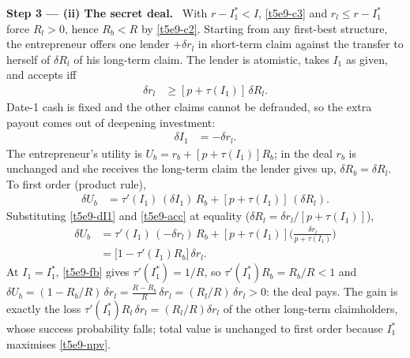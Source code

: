 \documentclass[11pt,a4paper]{article}
\newcommand{\step}[2]{\par\medskip\noindent\textbf{Step #1 --- #2.}~}
\begin{document}
\step{3}{(ii) The secret deal} With $r-I_1^*<I$, \eqref{t5e9-c3} and $r_l\le r-I_1^*$ force $R_l>0$, hence $R_b<R$
by \eqref{t5e9-c2}. Starting from any first-best structure, the entrepreneur offers one lender $+\delta r_l$ in short-term
claim against the transfer to herself of $\delta R_l$ of his long-term claim. The lender is atomistic, takes $I_1$ as given,
and accepts iff
\begin{align}
  \delta r_l &\ge [p+\tau(I_1)]\,\delta R_l. \label{t5e9-acc}
\end{align}
Date-1 cash is fixed and the other claims cannot be defrauded, so the extra payout comes out of deepening investment:
\begin{align}
  \delta I_1 &= -\delta r_l. \label{t5e9-dI1}
\end{align}
The entrepreneur's utility is $U_b=r_b+[p+\tau(I_1)]R_b$; in the deal $r_b$ is unchanged and she
receives the long-term claim the lender gives up, $\delta R_b=\delta R_l$. To first order (product rule),
\begin{align}
  \delta U_b &= \tau'(I_1)\,(\delta I_1)\,R_b + [p+\tau(I_1)]\,(\delta R_l). \nonumber
\end{align}
Substituting \eqref{t5e9-dI1} and \eqref{t5e9-acc} at equality ($\delta R_l=\delta r_l/[p+\tau(I_1)]$),
\begin{align}
  \delta U_b &= \tau'(I_1)\,(-\delta r_l)\,R_b + [p+\tau(I_1)]\Big(\frac{\delta r_l}{p+\tau(I_1)}\Big) \nonumber\\
             &= \big[1-\tau'(I_1)R_b\big]\,\delta r_l. \label{t5e9-dU}
\end{align}
At $I_1=I_1^*$, \eqref{t5e9-fb} gives $\tau'(I_1^*)=1/R$, so $\tau'(I_1^*)R_b=R_b/R<1$ and
$\delta U_b=(1-R_b/R)\,\delta r_l=\frac{R-R_b}{R}\,\delta r_l=(R_l/R)\,\delta r_l>0$: the deal pays. The gain is
exactly the loss $\tau'(I_1^*)R_l\,\delta r_l=(R_l/R)\delta r_l$ of the other long-term claimholders, whose success probability
falls; total value is unchanged to first order because $I_1^*$ maximises \eqref{t5e9-npv}.
\end{document}
